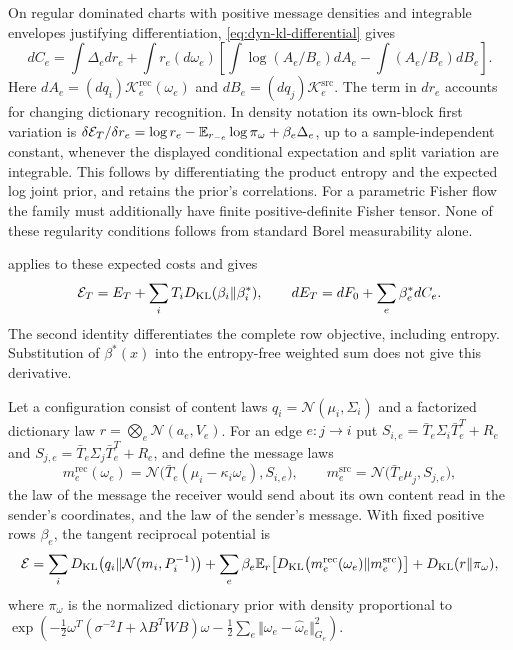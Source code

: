 On regular dominated charts with positive message densities and integrable envelopes justifying differentiation, \cref{eq:dyn-kl-differential} gives
\begin{equation}
 dC_e=\int\Delta_e dr_e+
 \int r_e(d\omega_e)\left[\int\log(A_e/B_e)dA_e-\int(A_e/B_e)dB_e\right].
 \label{it2:law-cost-variation}
\end{equation}
Here $dA_e=(dq_i)\mathcal K_e^{\mathrm{rec}}(\omega_e)$ and $dB_e=(dq_j)\mathcal K_e^{\mathrm{src}}$. The term in $dr_e$ accounts for changing dictionary recognition. In density notation its own-block first variation is $\delta\mathcal E_T/\delta r_e=\log r_e-\mathbb E_{r_{-e}}\log\pi_\omega+\beta_e\Delta_e$, up to a sample-independent constant, whenever the displayed conditional expectation and split variation are integrable. This follows by differentiating the product entropy and the expected log joint prior, and retains the prior's correlations. For a parametric Fisher flow the family must additionally have finite positive-definite Fisher tensor. None of these regularity conditions follows from standard Borel measurability alone.

 applies to these expected costs and gives
\begin{equation}
 \mathcal E_T=E_T+\sum_iT_iD_{\mathrm{KL}}(\beta_i\Vert\beta_i^*),
 \qquad dE_T=dF_0+\sum_e\beta_e^*dC_e.
 \label{it2:row-gap}
\end{equation}
The second identity differentiates the complete row objective, including entropy. Substitution of $\beta^*(x)$ into the entropy-free weighted sum does not give this derivative.

Let a configuration consist of content laws $q_i=\mathcal N(\mu_i,\Sigma_i)$ and a factorized dictionary law $r=\bigotimes_e\mathcal N(a_e,V_e)$. For an edge $e:j\to i$ put $S_{i,e}=\bar T_e\Sigma_i\bar T_e^T+R_e$ and $S_{j,e}=\bar T_e\Sigma_j\bar T_e^T+R_e$, and define the message laws
\begin{equation}
m_e^{\mathrm{rec}}(\omega_e)=\mathcal N\bigl(\bar T_e(\mu_i-\kappa_i\omega_e),S_{i,e}\bigr),\qquad
m_e^{\mathrm{src}}=\mathcal N\bigl(\bar T_e\mu_j,S_{j,e}\bigr),
\label{it2:message-laws}
\end{equation}
the law of the message the receiver would send about its own content read in the sender's coordinates, and the law of the sender's message. With fixed positive rows $\beta_e$, the tangent reciprocal potential is
\begin{equation}
\mathcal E=\sum_iD_{\mathrm{KL}}\bigl(q_i\Vert\mathcal N(m_i,P_i^{-1})\bigr)+\sum_e\beta_e\mathbb E_r\bigl[D_{\mathrm{KL}}\bigl(m_e^{\mathrm{rec}}(\omega_e)\Vert m_e^{\mathrm{src}}\bigr)\bigr]+D_{\mathrm{KL}}(r\Vert\pi_\omega),
\label{it2:potential-eq}
\end{equation}
where $\pi_\omega$ is the normalized dictionary prior with density proportional to $\exp(-\frac12\omega^T(\sigma^{-2}I+\lambda B^TWB)\omega-\frac12\sum_e\Vert\omega_e-\hat\omega_e\Vert_{G_e}^2)$.

